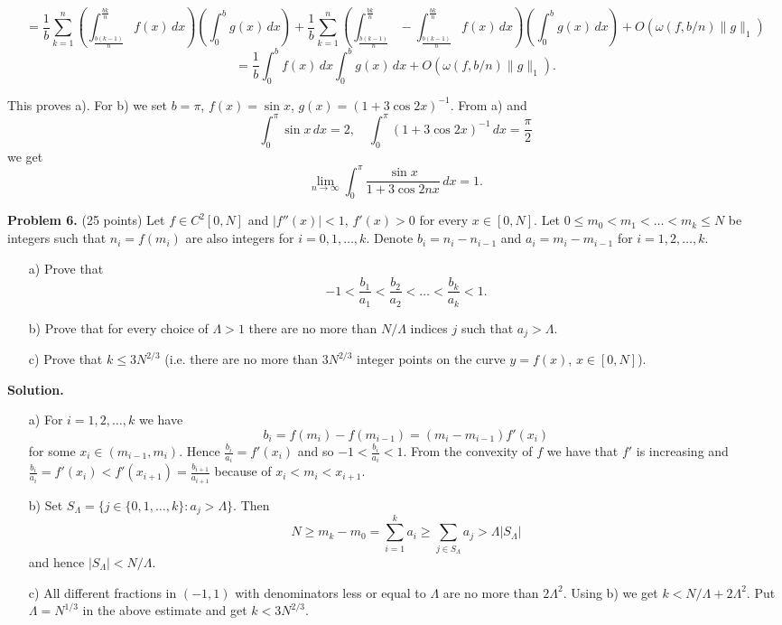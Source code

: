 \documentclass{article}
\begin{document}
\[
= \frac{1}{b} \sum_{k=1}^{n} \left( \int_{\frac{b(k-1)}{n}}^{\frac{bk}{n}} f(x) \, dx \right) \left( \int_{0}^{b} g(x) \, dx \right) + \frac{1}{b} \sum_{k=1}^{n} \left( \int_{\frac{b(k-1)}{n}}^{\frac{bk}{n}} - \int_{\frac{b(k-1)}{n}}^{\frac{bk}{n}} f(x) \, dx \right) \left( \int_{0}^{b} g(x) \, dx \right) + O(\omega(f, b/n)\|g\|_1)
\]
\[
= \frac{1}{b} \int_{0}^{b} f(x) \, dx \int_{0}^{b} g(x) \, dx + O(\omega(f, b/n)\|g\|_1).
\]

This proves a). For b) we set $b = \pi$, $f(x) = \sin x$, $g(x) = (1 + 3\cos 2x)^{-1}$. From a) and
\[
\int_{0}^{\pi} \sin x \, dx = 2, \quad \int_{0}^{\pi} (1 + 3\cos 2x)^{-1} \, dx = \frac{\pi}{2}
\]
we get
\[
\lim_{n \to \infty} \int_{0}^{\pi} \frac{\sin x}{1 + 3\cos 2nx} \, dx = 1.
\]

\textbf{Problem 6.} (25 points) Let $f \in C^2[0, N]$ and $|f''(x)| < 1$, $f'(x) > 0$ for every $x \in [0, N]$. Let $0 \leq m_0 < m_1 < \ldots < m_k \leq N$ be integers such that $n_i = f(m_i)$ are also integers for $i = 0, 1, \ldots, k$. Denote $b_i = n_i - n_{i-1}$ and $a_i = m_i - m_{i-1}$ for $i = 1, 2, \ldots, k$.
\begin{enumerate}
    \item[a)] Prove that
    \[
    -1 < \frac{b_1}{a_1} < \frac{b_2}{a_2} < \ldots < \frac{b_k}{a_k} < 1.
    \]

    \item[b)] Prove that for every choice of $\Lambda > 1$ there are no more than $N/\Lambda$ indices $j$ such that $a_j > \Lambda$.

    \item[c)] Prove that $k \leq 3N^{2/3}$ (i.e. there are no more than $3N^{2/3}$ integer points on the curve $y = f(x)$, $x \in [0, N]$).
\end{enumerate}

\textbf{Solution.}
\begin{enumerate}
    \item[a)] For $i = 1, 2, \ldots, k$ we have
    \[
        b_i = f(m_i) - f(m_{i-1}) = (m_i - m_{i-1})f'(x_i)
\]
    for some $x_i \in (m_{i-1}, m_i)$.
    Hence $\frac{b_i}{a_i} = f'(x_i)$ and so $-1 < \frac{b_i}{a_i} < 1$.
    From the convexity of $f$ we have that $f'$ is increasing and
    $\frac{b_i}{a_i} = f'(x_i) < f'(x_{i+1}) = \frac{b_{i+1}}{a_{i+1}}$
    because of $x_i < m_i < x_{i+1}$.

    \item[b)] Set $S_{\Lambda} = \{j \in \{0,1,\ldots,k\} : a_j > \Lambda\}$. Then
    \[
    N \geq m_k - m_0 = \sum_{i=1}^{k} a_i \geq \sum_{j \in S_{\Lambda}} a_j > \Lambda |S_{\Lambda}|
    \]
    and hence $|S_{\Lambda}| < N/\Lambda$.

    \item[c)] All different fractions in $(-1,1)$ with denominators less or equal to $\Lambda$ are no more than $2\Lambda^2$. Using b) we get $k < N/\Lambda + 2\Lambda^2$. Put $\Lambda = N^{1/3}$ in the above estimate and get $k < 3N^{2/3}$.
\end{enumerate}
\end{document}
